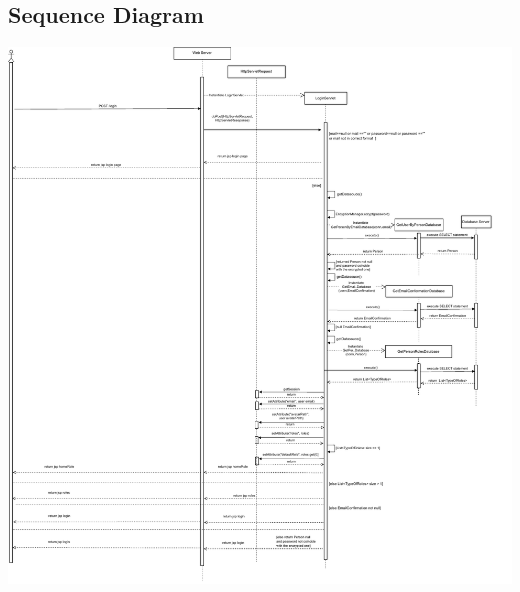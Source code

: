 \subsection{Sequence Diagram}

\includegraphics[width=\columnwidth,height=\textheight]{resources/Sequence_Diagram2-cropped.pdf}

